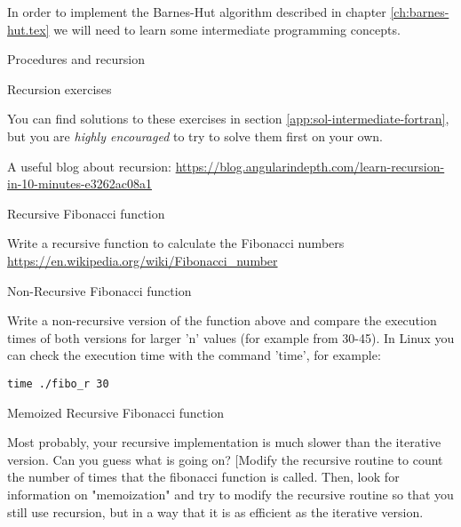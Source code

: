 
In order to implement the Barnes-Hut algorithm described in chapter
\ref{ch:barnes-hut.tex} we will need to learn some intermediate programming
concepts.

 {Procedures and recursion}


 {Recursion exercises}
\label{sec:recursion-exercises}

You can find solutions to these exercises in section
\ref{app:sol-intermediate-fortran}, but you are \emph{highly encouraged} to try to solve
them first on your own.

A useful blog about recursion: \url{https://blog.angularindepth.com/learn-recursion-in-10-minutes-e3262ac08a1}


 {Recursive Fibonacci function}
\label{ex:rec-fib}

Write a recursive function to calculate the Fibonacci numbers
\url{https://en.wikipedia.org/wiki/Fibonacci_number}

 {Non-Recursive Fibonacci function}
\label{ex:nonrec-fib}

Write a non-recursive version of the function above and compare the execution
times of both versions for larger 'n' values (for example from 30-45). In Linux
you can check the execution time with the command 'time', for example:

\begin{verbatim}
time ./fibo_r 30
\end{verbatim}

 {Memoized Recursive Fibonacci function}
\label{ex:memo_rec-fib}

Most probably, your recursive implementation is much slower than the iterative
version. Can you guess what is going on? [Modify the recursive routine to count
  the number of times that the fibonacci function is called. Then, look for
  information on "memoization" and try to modify the recursive routine so that
  you still use recursion, but in a way that it is as efficient as the iterative
  version. 

